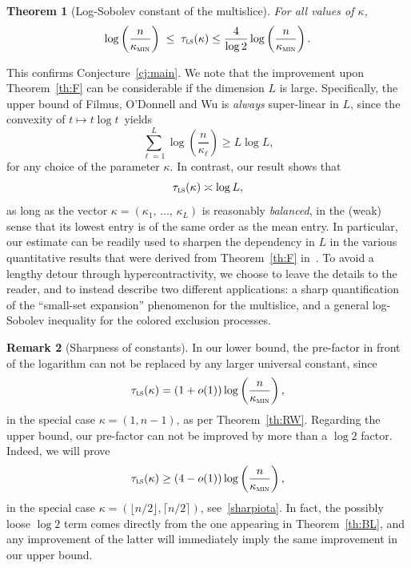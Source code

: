 \documentclass[10pt]{amsart}
\newtheorem{theo}{Theorem}[section]
\theoremstyle{definition}\newtheorem{defi}[theo]{Definition}\newtheorem{rema}[theo]{Remark}\newtheorem{exam}[theo]{Example}\newtheorem{exem}[theo]{Example}\newtheorem{nota}[theo]{Notation}
\newcommand{\tls}{\tau_{\textsc{ls}}}
\newcommand{\am}{{\kappa_{\textsc{min}}}}
\begin{document}
\begin{theo}[Log-Sobolev constant of the multislice]\label{th:main}
For all values of $\kappa$,
\[
\log\left(\frac{n}{\am}\right) \; \le \; \tls(\kappa) \le \frac{4}{\log 2}\log\left(\frac{n}{\am}\right).
\]
\end{theo}


This confirms Conjecture~\ref{cj:main}. We note that the improvement upon Theorem~\ref{th:F} can be considerable if the dimension $L$ is large. Specifically, the upper bound of Filmus, {O'Donnell} and {Wu} is \emph{always} super-linear in $L$, since the convexity of $t\mapsto t\log t$~yields
\begin{equation}\label{llogl}
\sum_{\ell=1}^L \log \left(\frac{n}{\kappa_\ell}\right) \ge L\log L,
\end{equation}
for any choice of the parameter $\kappa$. In contrast, our result shows that
\[
\tls(\kappa) \asymp \log L,
\]
as long as the vector $\kappa=(\kappa_1,\,\ldots,\,\kappa_L)$ is reasonably \emph{balanced}, in the (weak) sense that its lowest entry is of the same order as the mean entry. In particular, our estimate can be readily used to sharpen the dependency in $L$ in the various quantitative results that were derived from Theorem~\ref{th:F} in~\cite{2018arXiv180903546F}. To avoid a lengthy detour through hypercontractivity, we choose to leave the details to the reader, and to instead describe two different applications: a sharp quantification of the ``small-set expansion'' phenomenon for the multislice, and a general log-Sobolev inequality for the {colored exclusion processes}.


\begin{rema}[Sharpness of constants]\label{rk:sharp}
In our lower bound, the pre-factor in front of the logarithm can not be replaced by any larger universal constant, since
\[
\tls(\kappa) = \left(1+o(1)\right)\log\left(\frac{n}{\am}\right),
\]
in the special case $\kappa=(1,n-1)$, as per Theorem~\ref{th:RW}. Regarding the upper bound, our pre-factor can not be improved by more than a $\log 2$ factor. Indeed, we will prove
\[
\tls(\kappa) \ge \left(4-o(1)\right)\log\left(\frac{n}{\am}\right),
\]
in the special case $\kappa=(\lfloor n/2\rfloor,\lceil n/2\rceil)$, see~\eqref{sharpiota}. In fact, the possibly loose $\log 2$ term comes directly from the one appearing in Theorem~\ref{th:BL}, and any improvement of the latter will immediately imply the same improvement in our upper bound.
\end{rema}
\end{document}
